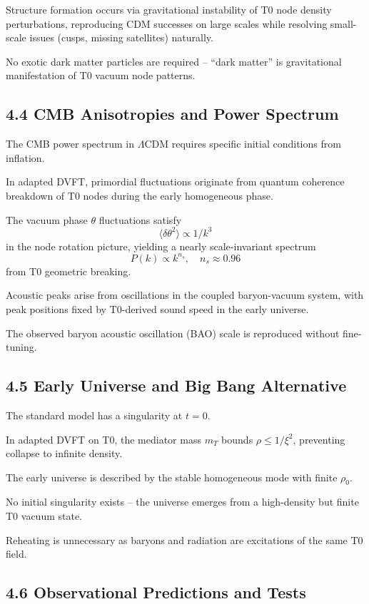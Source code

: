 	Structure formation occurs via gravitational instability of T0 node density perturbations, reproducing CDM successes on large scales while resolving small-scale issues (cusps, missing satellites) naturally.
	
	No exotic dark matter particles are required – ``dark matter'' is gravitational manifestation of T0 vacuum node patterns.
	
	\subsection{4.4 CMB Anisotropies and Power Spectrum}
	
	The CMB power spectrum in $\Lambda$CDM requires specific initial conditions from inflation.
	
	In adapted DVFT, primordial fluctuations originate from quantum coherence breakdown of T0 nodes during the early homogeneous phase.
	
	The vacuum phase $\theta$ fluctuations satisfy
	\[
	\langle \delta \theta^2 \rangle \propto 1/k^3
	\]
	in the node rotation picture, yielding a nearly scale-invariant spectrum
	\[
	P(k) \propto k^{n_s}, \quad n_s \approx 0.96
	\]
	from T0 geometric breaking.
	
	Acoustic peaks arise from oscillations in the coupled baryon-vacuum system, with peak positions fixed by T0-derived sound speed in the early universe.
	
	The observed baryon acoustic oscillation (BAO) scale is reproduced without fine-tuning.
	
	\subsection{4.5 Early Universe and Big Bang Alternative}
	
	The standard model has a singularity at $t=0$.
	
	In adapted DVFT on T0, the mediator mass $m_T$ bounds $\rho \leq 1/\xi^2$, preventing collapse to infinite density.
	
	The early universe is described by the stable homogeneous mode with finite $\rho_0$.
	
	No initial singularity exists – the universe emerges from a high-density but finite T0 vacuum state.
	
	Reheating is unnecessary as baryons and radiation are excitations of the same T0 field.
	
	\subsection{4.6 Observational Predictions and Tests}
	

